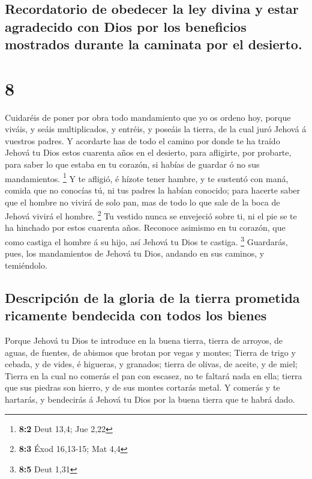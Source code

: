 \hypertarget{recordatorio-de-obedecer-la-ley-divina-y-estar-agradecido-con-dios-por-los-beneficios-mostrados-durante-la-caminata-por-el-desierto.}{%
\subsection{Recordatorio de obedecer la ley divina y estar agradecido
con Dios por los beneficios mostrados durante la caminata por el
desierto.}\label{recordatorio-de-obedecer-la-ley-divina-y-estar-agradecido-con-dios-por-los-beneficios-mostrados-durante-la-caminata-por-el-desierto.}}

\hypertarget{section-7}{%
\section{8}\label{section-7}}

 Cuidaréis de poner por obra todo mandamiento que yo os
ordeno hoy, porque viváis, y seáis multiplicados, y entréis, y poseáis
la tierra, de la cual juró Jehová á vuestros padres.  Y
acordarte has de todo el camino por donde te ha traído Jehová tu Dios
estos cuarenta años en el desierto, para afligirte, por probarte, para
saber lo que estaba en tu corazón, si habías de guardar ó no sus
mandamientos. \footnote{\textbf{8:2} Deut 13,4; Jue 2,22} 
Y te afligió, é hízote tener hambre, y te sustentó con maná, comida que
no conocías tú, ni tus padres la habían conocido; para hacerte saber que
el hombre no vivirá de solo pan, mas de todo lo que sale de la boca de
Jehová vivirá el hombre. \footnote{\textbf{8:3} Éxod 16,13-15; Mat 4,4}
 Tu vestido nunca se envejeció sobre ti, ni el pie se te
ha hinchado por estos cuarenta años.  Reconoce asimismo en
tu corazón, que como castiga el hombre á su hijo, así Jehová tu Dios te
castiga. \footnote{\textbf{8:5} Deut 1,31}  Guardarás,
pues, los mandamientos de Jehová tu Dios, andando en sus caminos, y
temiéndolo.

\hypertarget{descripciuxf3n-de-la-gloria-de-la-tierra-prometida-ricamente-bendecida-con-todos-los-bienes}{%
\subsection{Descripción de la gloria de la tierra prometida ricamente
bendecida con todos los
bienes}\label{descripciuxf3n-de-la-gloria-de-la-tierra-prometida-ricamente-bendecida-con-todos-los-bienes}}

 Porque Jehová tu Dios te introduce en la buena tierra,
tierra de arroyos, de aguas, de fuentes, de abismos que brotan por vegas
y montes;  Tierra de trigo y cebada, y de vides, é
higueras, y granados; tierra de olivas, de aceite, y de miel;
 Tierra en la cual no comerás el pan con escasez, no te
faltará nada en ella; tierra que sus piedras son hierro, y de sus montes
cortarás metal.  Y comerás y te hartarás, y bendecirás á
Jehová tu Dios por la buena tierra que te habrá dado.

